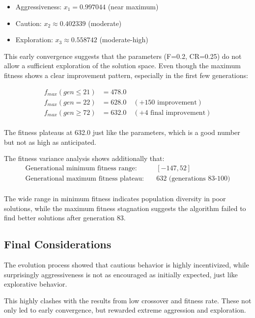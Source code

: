 \documentclass[sigconf]{acmart} %
\begin{document}
\begin{itemize}
    \item Aggressiveness: $x_1 = 0.997044$ (near maximum)
    \item Caution: $x_2 \approx 0.402339$ (moderate)  
    \item Exploration: $x_3 \approx 0.558742$ (moderate-high)\\
\end{itemize}


This early convergence suggests that the parameters (F=0.2, CR=0.25) do not allow a sufficient exploration of the solution space. Even though the maximum fitness shows a clear improvement pattern, especially in the first few generations:

\begin{align}
f_{max}(gen \leq 21) &= 478.0 \\
f_{max}(gen = 22) &= 628.0 \quad (+150 \text{ improvement}) \\
f_{max}(gen \geq 72) &= 632.0 \quad (+4 \text{ final improvement})
\end{align}
\\
The fitness plateaus at 632.0 just like the parameters, which is a good number but not as high as anticipated.

The fitness variance analysis  shows additionally that:\\
\begin{align}
\text{Generational minimum fitness range:} &\quad [-147, 52] \\
\text{Generational maximum fitness plateau:} &\quad 632 \text{ (generations 83-100)}\\
\end{align}

The wide range in minimum fitness indicates population diversity in poor solutions, while the maximum fitness stagnation suggests the algorithm failed to find better solutions after generation 83.

\subsection{Final Considerations}

The evolution process showed that cautious behavior is highly incentivized, while surprisingly aggressiveness is not as encouraged as initially expected, just like explorative behavior.

This highly clashes with the results from low crossover and fitness rate. These not only led to early convergence, but rewarded extreme aggression and exploration.
\end{document}
